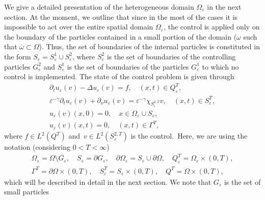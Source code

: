 \documentclass[reqno]{amsart}
\begin{document}
 We give a detailed presentation of the heterogeneous domain $\Omega
_{\varepsilon }$ in the next section. At the moment, we outline that
since in the most of the cases it is impossible to act over the
entire spatial domain $\Omega _{\varepsilon }$, the control is applied only
on the boundary of the particles contained in a small portion of the domain
($\omega $ such that $\overline{\omega }\subset \Omega $).
Thus, the set of boundaries of the internal particles is constituted in the form
$S_{\varepsilon }=S_{\varepsilon }^{1}\cup S_{\varepsilon }^2$, where
$S_{\varepsilon }^2$ is the set of boundaries of the controlling particles
$G_{\varepsilon }^2$ and $S_{\varepsilon }^{1}$ is the set of boundaries of
the particles $G_{\varepsilon }^{1}$ to which no control is implemented. The
state of the control problem is given through
\begin{equation}
\begin{gathered}
\partial _{t}u_{\varepsilon }(v)-\Delta u_{\varepsilon }(v)=f, \quad
 (x,t)\in Q_{\varepsilon }^{T}, \\
\varepsilon ^{-\gamma }\partial _{t}u_{\varepsilon }(v)+\partial _{\nu
}u_{\varepsilon }(v)=\varepsilon ^{-\gamma }\chi _{S_{\varepsilon }^{2,T}}v,
\quad (x,t)\in S_{\varepsilon }^{T}, \\
u_{\varepsilon }(v)(x,0)=0, \quad x\in \Omega _{\varepsilon }\cup
S_{\varepsilon }, \\
u_{\varepsilon }(v)(x,t)=0, \quad (x,t)\in \Gamma ^{T},%
\end{gathered}  \label{init state prob}
\end{equation}
where $f\in L^2(Q^{T})$ and\textrm{\ }$v\in L^2(S_{\varepsilon }^{2,T})$
is the control.\textrm{\ }Here, we are using the notation
(considering $0<T<\infty $)
\begin{equation}
\begin{gathered}
\Omega _{\varepsilon }=\Omega \setminus \overline{G_{\varepsilon }}, \quad
S_{\varepsilon }=\partial G_{\varepsilon }, \quad
\partial \Omega _{\varepsilon }=S_{\varepsilon }\cup \partial \Omega ,   \quad
Q_{\varepsilon }^{T}=\Omega _{\varepsilon }\times (0,T), \\
\Gamma^{T}=\partial \Omega \times (0,T), \quad
S_{\varepsilon }^{T}=S_{\varepsilon }\times (0,T), \quad Q^{T}=\Omega \times (0,T),
\end{gathered}
\label{def: basic sets}
\end{equation}
which will be described in detail in the next section. We note that
$G_{\varepsilon }$ is the set of small particles
\end{document}
